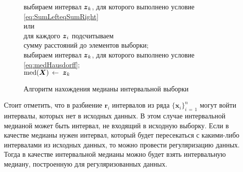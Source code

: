 \documentclass[a5paper,openany]{book}
\newcommand{\mbf}[1]{\protect\text{\boldmath$#1$}}
\newcommand{\md}{\operatorname{med}}
\begin{document}
\begin{figure}[!hp]
{{\begin{minipage}{100mm}
\begin{tabbing}
				\>\> выбираем интервал $\mbf{z}_{k}$, для которого выполнено условие \eqref{eq:SumLefteqSumRight} \\[1mm]
				\>\> или \\[1mm]
				\>\> для каждого $\mbf{z}_{i} $ подсчитываем  \\[1mm]
				\>\> сумму расстояний до элементов выборки;                 \\[1mm]
				\>\> выбираем интервал $\mbf{z}_{k}$, для которого выполнено условие \eqref{eq:medHausdorff};~~~\\[3mm]
				\> $\md (\mbf{X})\, \gets \;  \mbf{z}_{k}$              %
			\end{tabbing} 
		\end{minipage}
	} 
} %
\caption{Алгоритм нахождения медианы интервальной выборки} 
\label{MedAlgo} 
\end{figure}

Стоит отметить, что в разбиение $\boldsymbol{r}_i$ интервалов из ряда $\{\boldsymbol{x}_i\}_{i\,=\,1}^n$ могут войти интервалы, которых нет в исходных данных. В этом случае интервальной медианой может быть интервал, не входящий в исходную выборку. 
Если в качестве медианы нужен интервал, который будет пересекаться с какими-либо интервалами из исходных данных, то можно провести регуляризацию данных. Тогда в качестве интервальной медианы можно будет взять интервальную медиану, построенную для регуляризованных данных.
\end{document}
